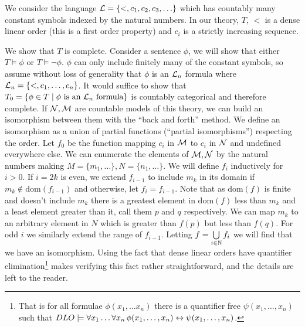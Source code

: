 \begin{example}\label{example_categoricity_sequence}
We consider the language \(\mathcal{L} = \{<, c_1, c_2, c_3, \ldots\}\) which has countably many constant symbols indexed by the natural numbers. 
In our theory, \(T\), \(<\) is a dense linear order (this is a first order property) and \(c_i\) is a strictly increasing sequence. 

We show that \(T\) is complete.
Consider a sentence \(\phi\), we will show that either \(T \models \phi\) or \(T \models \neg \phi\). 
\(\phi\) can only include finitely many of the constant symbols, so assume without loss of generality that \(\phi\) is an \(\mathcal{L}_n\) formula where \(\mathcal{L}_n = \{<, c_1, \ldots, c_n\}\).
It would suffice to show that \(T_0 = \{\phi \in T \mid \phi \text{ is an } \mathcal{L}_n \text{ formula}\}\) is countably categorical and therefore complete. 
If \(\mathcal{N}, \mathcal{M}\) are countable models of this theory, we can build an isomorphism between them with the ``back and forth'' method. 
We define an isomorphism as a union of partial functions (``partial isomorphisms'') respecting the order. 
Let \(f_0\) be the function mapping \(c_i\) in \(\mathcal{M}\) to \(c_i\) in \(\mathcal{N}\) and undefined everywhere else. 
We can enumerate the elements of \(\mathcal{M}, \mathcal{N}\) by the natural numbers making \(M = \{m_1, \ldots\}, N = \{n_1, \ldots\}\). 
We will define \(f_i\) inductively for \(i > 0\). 
If \(i=2k\) is even, we extend \(f_{i-1}\) to include \(m_{k}\) in its domain if \(m_{k} \notin \text{dom}(f_{i-1})\) and otherwise, let \(f_i = f_{i-1}\).
Note that as \(\text{dom}(f)\) is finite and doesn't include \(m_{k}\) there is a greatest element in \(\text{dom}(f)\) less than \(m_{k}\) and a least element greater than it, call them \(p\) and \(q\) respectively.
We can map \(m_{k}\) to an arbitrary element in \(N\) which is greater than \(f(p)\) but less than \(f(q)\). 
For odd \(i\) we similarly extend the range of \(f_{i-1}\). 
Letting \(f = \bigcup\limits_{i \in \mathbb{N}}f_i\) we will find that we have an isomorphism. 
Using the fact that dense linear orders have quantifier elimination\footnote{That is for all formulae \(\phi(x_1, \ldots x_n)\) there is a quantifier free \(\psi(x_1, \ldots, x_n)\) such that \(DLO \models \forall x_1 \ldots \forall x_n \, \phi(x_1, \ldots, x_n) \leftrightarrow \psi(x_1, \ldots, x_n)\).} \cite{mar} makes verifying this fact rather straightforward, and the details are left to the reader.
 

\end{example}
